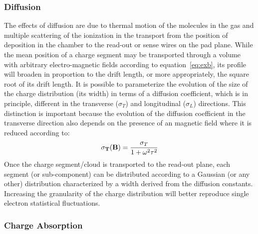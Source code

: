 \documentclass{article}
\begin{document}
\subsubsection{Diffusion}

The effects of diffusion are due to thermal motion of the molecules
in the gas and multiple scattering of
the ionization in the transport from the position of deposition
in the chamber to the read-out or sense wires on the pad plane.
While the mean position of a charge segment may be transported through
a volume with arbitrary electro-magnetic fields according to
equation~\ref{eq:exb}, its profile will broaden
in proportion to the drift length, or more appropriately,
the square root of its drift length.
It is possible to parameterize the evolution of the size of the
charge distribution (its width) in terms of a diffusion coefficient,
which is in principle,
different in the transverse ($\sigma_{T}$) and longitudinal ($\sigma_{L}$)
directions.  This distinction is important because the evolution
of the diffusion coefficient in the transverse direction also
depends on the presence of an magnetic field where it is
reduced according to:
\begin{equation}
{\bf \sigma_{T}(B)} = \frac{\sigma_{T}}{1 + \omega ^{2} \tau ^{2}}
\label{eq:diffusion}
\end{equation}
Once the charge segment/cloud is transported to the read-out plane,
each segment (or sub-component) can be distributed according to a
Gaussian (or any other) distribution characterized by a width derived
from the diffusion constants.  Increasing the granularity of the
charge distribution will better reproduce single electron statistical
fluctuations.

\subsubsection{Charge Absorption}
        
\end{document}
